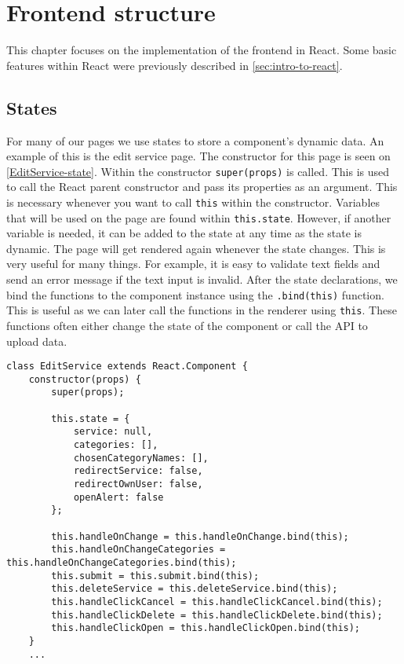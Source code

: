 \section{Frontend structure}
This chapter focuses on the implementation of the frontend in React.
Some basic features within React were previously described in \autoref{sec:intro-to-react}.


\subsection{States}
For many of our pages we use states to store a component's dynamic data. 
An example of this is the edit service page. 
The constructor for this page is seen on \autoref{EditService-state}.
Within the constructor \texttt{super(props)} is called. 
This is used to call the React parent constructor and pass its properties as an argument.
This is necessary whenever you want to call \texttt{this} within the constructor.
Variables that will be used on the page are found within \texttt{this.state}. 
However, if another variable is needed, it can be added to the state at any time as the state is dynamic.
The page will get rendered again whenever the state changes. 
This is very useful for many things. 
For example, it is easy to validate text fields and send an error message if the text input is invalid.  
After the state declarations, we bind the functions to the component instance using the \texttt{.bind(this)} function.
This is useful as we can later call the functions in the renderer using \texttt{this}.
These functions often either change the state of the component or call the API to upload data.
\begin{lstlisting}[caption={Constructor and state for edit service}, captionpos=b, label={EditService-state}]
class EditService extends React.Component {
    constructor(props) {
        super(props);
    
        this.state = {
            service: null,
            categories: [],
            chosenCategoryNames: [],
            redirectService: false,
            redirectOwnUser: false,
            openAlert: false
        };
            
        this.handleOnChange = this.handleOnChange.bind(this);
        this.handleOnChangeCategories = this.handleOnChangeCategories.bind(this);
        this.submit = this.submit.bind(this);
        this.deleteService = this.deleteService.bind(this);
        this.handleClickCancel = this.handleClickCancel.bind(this);
        this.handleClickDelete = this.handleClickDelete.bind(this);
        this.handleClickOpen = this.handleClickOpen.bind(this);
    }
    ...
\end{lstlisting}

